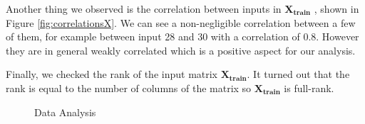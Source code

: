 \documentclass{article} %
\begin{document}
Another thing we observed is the correlation between inputs in  $\mathbf{X_{train}}$ , shown in Figure \ref{fig:correlationsX}. We can see a non-negligible correlation between a few of them, for example between input 28 and 30 with a correlation of 0.8. However they are in general weakly correlated which is a positive aspect for our analysis.


Finally, we checked the rank of the input matrix $\mathbf{X_{train}}$. It turned out that the rank is equal to the number of columns of the matrix so $\mathbf{X_{train}}$ is full-rank.

\begin{figure}[!t]
\center
{}
\hfill
{}
\caption{Data Analysis}
\end{figure}
\end{document}
